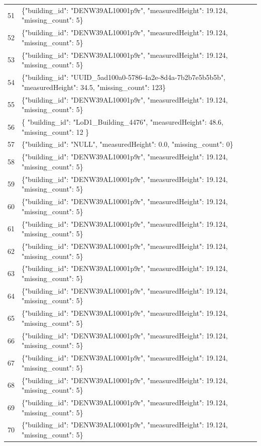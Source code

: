 \documentclass[a4paper,11pt]{article}
\begin{document}
\begin{table}[ht]
\begin{tabular}{r p{12cm}}
51 & \{"building\_id": "DENW39AL10001p9r", "measuredHeight": 19.124, "missing\_count": 5\} \\
52 & \{"building\_id": "DENW39AL10001p9r", "measuredHeight": 19.124, "missing\_count": 5\} \\
53 & \{"building\_id": "DENW39AL10001p9r", "measuredHeight": 19.124, "missing\_count": 5\} \\
54 & \{"building\_id": "UUID\_5ad100a0-5786-4a2e-8d4a-7b2b7e5b5b5b", "measuredHeight": 34.5, "missing\_count": 123\} \\
55 & \{"building\_id": "DENW39AL10001p9r", "measuredHeight": 19.124, "missing\_count": 5\} \\
56 & \{
  "building\_id": "LoD1\_Building\_4476",
  "measuredHeight": 48.6,
  "missing\_count": 12
\} \\
57 & \{"building\_id": "NULL", "measuredHeight": 0.0, "missing\_count": 0\} \\
58 & \{"building\_id": "DENW39AL10001p9r", "measuredHeight": 19.124, "missing\_count": 5\} \\
59 & \{"building\_id": "DENW39AL10001p9r", "measuredHeight": 19.124, "missing\_count": 5\} \\
60 & \{"building\_id": "DENW39AL10001p9r", "measuredHeight": 19.124, "missing\_count": 5\} \\
61 & \{"building\_id": "DENW39AL10001p9r", "measuredHeight": 19.124, "missing\_count": 5\} \\
62 & \{"building\_id": "DENW39AL10001p9r", "measuredHeight": 19.124, "missing\_count": 5\} \\
63 & \{"building\_id": "DENW39AL10001p9r", "measuredHeight": 19.124, "missing\_count": 5\} \\
64 & \{"building\_id": "DENW39AL10001p9r", "measuredHeight": 19.124, "missing\_count": 5\} \\
65 & \{"building\_id": "DENW39AL10001p9r", "measuredHeight": 19.124, "missing\_count": 5\} \\
66 & \{"building\_id": "DENW39AL10001p9r", "measuredHeight": 19.124, "missing\_count": 5\} \\
67 & \{"building\_id": "DENW39AL10001p9r", "measuredHeight": 19.124, "missing\_count": 5\} \\
68 & \{"building\_id": "DENW39AL10001p9r", "measuredHeight": 19.124, "missing\_count": 5\} \\
69 & \{"building\_id": "DENW39AL10001p9r", "measuredHeight": 19.124, "missing\_count": 5\} \\
70 & \{"building\_id": "DENW39AL10001p9r", "measuredHeight": 19.124, "missing\_count": 5\} \\

\end{tabular}
\end{table}
\end{document}
